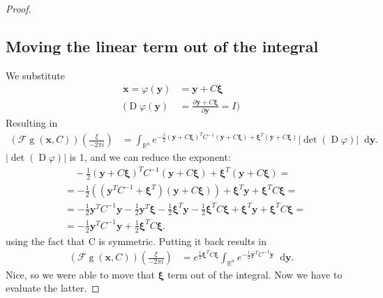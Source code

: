 \documentclass{paper}
\newcommand{\abs}[1]{\left| #1 \right|}
\newcommand{\F}{\ensuremath{\mathcal{F}}}
\newcommand{\vr}[1]{\ensuremath{\boldsymbol{#1}}}
\newcommand{\f}[1]{\operatorname{#1}}
\newcommand*\diff{\mathop{}\!\mathrm{d}}
\newcommand{\xivec}[0]{\ensuremath{\vr{\xi{}}}}
\newcommand{\yvec}[0]{\ensuremath{\vr{y}}}
\begin{document}
\begin{proof}
\subsection*{Moving the linear term out of the integral}
We substitute
\begin{align*}
	\vr{x} = \varphi(\vr{y}) &= \vr{y} + C\vr{\xi} \\
	\Bigg( \f{D}\varphi(\yvec) &= \frac{\partial \vr{y} + C\vr{\xi}}{\partial \vr{y}} = I \Bigg)
\end{align*}
Resulting in
\begin{align*}
	(\F\f{g}(\vr{x}, C))(\frac{\xi}{-2 \pi i})
	&= \int_{\mathbb{R}^n} e^{-\frac{1}{2} (\yvec + C\xivec)^T C^{-1} (\yvec + C\xivec) + \xivec^T (\yvec + C\xivec)} \abs{\f{det}(\f{D}\varphi)} \diff \yvec.
\end{align*}
$\abs{\f{det}(\f{D}\varphi)}$ is 1, and we can reduce the exponent:
\begin{align*}
	&\quad -\frac{1}{2} (\yvec + C\xivec)^T C^{-1} (\yvec + C\xivec) + \xivec^T (\yvec + C\xivec) = \\
	&= -\frac{1}{2} \left( (\yvec^T C^{-1} + \xivec^T)(\yvec + C \xivec) \right) + \xivec^T \yvec + \xivec^T C \xivec = \\
	&= -\frac{1}{2} \yvec^T C^{-1} \yvec - \frac{1}{2} \yvec^T \xivec -\frac{1}{2} \xivec^T \yvec -\frac{1}{2} \xivec^T C \xivec + \xivec^T \yvec + \xivec^T C \xivec = \\
	&= -\frac{1}{2} \yvec^T C^{-1} \yvec + \frac{1}{2} \xivec^T C \xivec.
\end{align*}
using the fact that C is symmetric.
Putting it back results in
\begin{align}
	\label{eq:fourier_only_gauss_int_left}
	(\F\f{g}(\vr{x}, C))(\frac{\xi}{-2 \pi i})
	&= e^{\frac{1}{2} \xivec^T C \xivec} \int_{\mathbb{R}^n} e^{-\frac{1}{2} \yvec^T C^{-1} \yvec}  \diff \yvec.
\end{align}
Nice, so we were able to move that $\xivec$ term out of the integral.
Now we have to evaluate the latter.



\end{proof}
\end{document}
